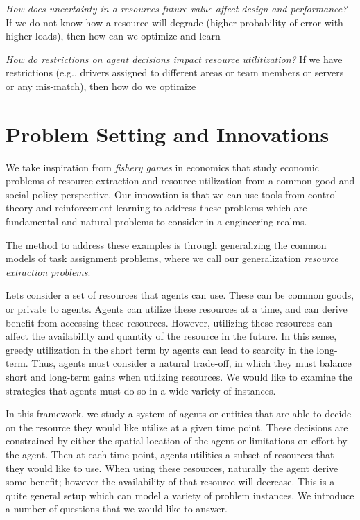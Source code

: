 \documentclass[letterpaper, 10 pt, conference]{ieeeconf}
\begin{document}
\noindent\textit{How does uncertainty in a resources future value affect design and performance?} If we do not know how a resource will degrade (higher probability of error with higher loads), then how can we optimize and learn

\noindent\textit{How do restrictions on agent decisions impact resource utilitization?} If we have restrictions (e.g.,  drivers assigned to different areas or team members or servers or any mis-match), then how do we optimize



\section{Problem Setting and Innovations}

We take inspiration from \emph{fishery games} in economics that study economic problems of resource extraction and resource utilization from a common good and social policy perspective. Our innovation is that we can use tools from control theory and reinforcement learning to address these problems which are fundamental and natural problems to consider in a engineering realms.

The method to address these examples is through generalizing the common models of task assignment problems, where we call our generalization \emph{resource extraction problems}. 

Lets consider a set of resources that agents can use. These can be common goods, or private to agents. Agents can utilize these resources at a time, and can derive benefit from accessing these resources. However, utilizing these resources can affect the availability and quantity of the resource in the future. In this sense, greedy utilization in the short term by agents can lead to scarcity in the long-term. Thus, agents must consider a natural trade-off, in which they must balance short and long-term gains when utilizing resources. We would like to examine the strategies that agents must do so in a wide variety of instances.

In this framework, we study a system of agents or entities that are able to decide on the resource they would like utilize at a given time point. These decisions are constrained by either the spatial location of the agent or limitations on effort by the agent. Then at each time point, agents utilities a subset of resources that they would like to use. When using these resources, naturally the agent derive some benefit; however the availability of that resource will decrease. This is a quite general setup which can model a variety of problem instances. We introduce a number of questions that we would like to answer.
\end{document}
